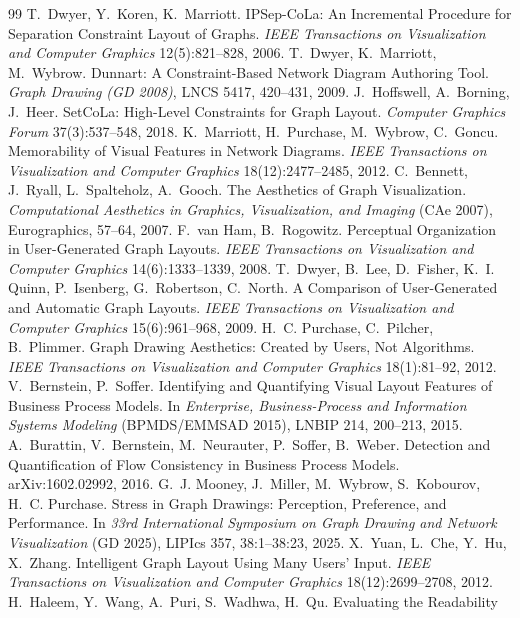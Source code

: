 \documentclass[11pt]{article}
\begin{document}
{\begin{thebibliography}{99}
 T.~Dwyer, Y.~Koren, K.~Marriott. IPSep-CoLa: An Incremental
 Procedure for Separation Constraint Layout of Graphs. \emph{IEEE Transactions on
 Visualization and Computer Graphics} 12(5):821--828, 2006.
 T.~Dwyer, K.~Marriott, M.~Wybrow. Dunnart: A Constraint-Based Network
 Diagram Authoring Tool. \emph{Graph Drawing (GD 2008)}, LNCS 5417, 420--431, 2009.
 J.~Hoffswell, A.~Borning, J.~Heer. SetCoLa: High-Level Constraints
 for Graph Layout. \emph{Computer Graphics Forum} 37(3):537--548, 2018.
 K.~Marriott, H.~Purchase, M.~Wybrow, C.~Goncu. Memorability of Visual
 Features in Network Diagrams. \emph{IEEE Transactions on Visualization and Computer
 Graphics} 18(12):2477--2485, 2012.
 C.~Bennett, J.~Ryall, L.~Spalteholz, A.~Gooch. The Aesthetics of Graph
 Visualization. \emph{Computational Aesthetics in Graphics, Visualization, and Imaging}
 (CAe 2007), Eurographics, 57--64, 2007.
 F.~van Ham, B.~Rogowitz. Perceptual Organization in User-Generated Graph
 Layouts. \emph{IEEE Transactions on Visualization and Computer Graphics} 14(6):1333--1339,
 2008.
 T.~Dwyer, B.~Lee, D.~Fisher, K.~I. Quinn, P.~Isenberg, G.~Robertson,
 C.~North. A Comparison of User-Generated and Automatic Graph Layouts. \emph{IEEE
 Transactions on Visualization and Computer Graphics} 15(6):961--968, 2009.
 H.~C. Purchase, C.~Pilcher, B.~Plimmer. Graph Drawing Aesthetics:
 Created by Users, Not Algorithms. \emph{IEEE Transactions on Visualization and Computer
 Graphics} 18(1):81--92, 2012.
 V.~Bernstein, P.~Soffer. Identifying and Quantifying Visual Layout
 Features of Business Process Models. In \emph{Enterprise, Business-Process and
 Information Systems Modeling} (BPMDS/EMMSAD 2015), LNBIP 214, 200--213, 2015.
 A.~Burattin, V.~Bernstein, M.~Neurauter, P.~Soffer, B.~Weber.
 Detection and Quantification of Flow Consistency in Business Process Models.
 arXiv:1602.02992, 2016.
 G.~J. Mooney, J.~Miller, M.~Wybrow, S.~Kobourov, H.~C. Purchase.
 Stress in Graph Drawings: Perception, Preference, and Performance. In \emph{33rd
 International Symposium on Graph Drawing and Network Visualization} (GD 2025), LIPIcs 357,
 38:1--38:23, 2025.
 X.~Yuan, L.~Che, Y.~Hu, X.~Zhang. Intelligent Graph Layout Using Many
 Users' Input. \emph{IEEE Transactions on Visualization and Computer Graphics}
 18(12):2699--2708, 2012.
 H.~Haleem, Y.~Wang, A.~Puri, S.~Wadhwa, H.~Qu. Evaluating the Readability

\end{thebibliography}}
\end{document}
